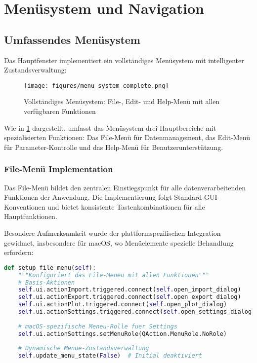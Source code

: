 \section{Menüsystem und Navigation}

\subsection{Umfassendes Menüsystem}

Das Hauptfenster implementiert ein vollständiges Menüsystem mit intelligenter Zustandsverwaltung:

\begin{figure}[H]
    \centering
\texttt{[image: figures/menu\_system\_complete.png]}
\caption{Vollständiges Menüsystem: File-, Edit- und Help-Menü mit allen verfügbaren Funktionen}
\label{fig:menu_system_complete}
\end{figure}

Wie in \ref{fig:menu_system_complete} dargestellt, umfasst das Menüsystem drei Hauptbereiche mit spezialisierten Funktionen: Das File-Menü für Datenmanagement, das Edit-Menü für Parameter-Kontrolle und das Help-Menü für Benutzerunterstützung.

\subsubsection{File-Menü Implementation}

Das File-Menü bildet den zentralen Einstiegspunkt für alle datenverarbeitenden Funktionen der Anwendung. Die Implementierung folgt Standard-GUI-Konventionen und bietet konsistente Tastenkombinationen für alle Hauptfunktionen.

Besondere Aufmerksamkeit wurde der plattformspezifischen Integration gewidmet, insbesondere für macOS, wo Menüelemente spezielle Behandlung erfordern:

\begin{lstlisting}[language=Python, caption=File-Menü Konfiguration]
def setup_file_menu(self):
    """Konfiguriert das File-Meneu mit allen Funktionen"""
    # Basis-Aktionen
    self.ui.actionImport.triggered.connect(self.open_import_dialog)
    self.ui.actionExport.triggered.connect(self.open_export_dialog)
    self.ui.actionPlot.triggered.connect(self.open_plot_dialog)
    self.ui.actionSettings.triggered.connect(self.open_settings_dialog)
    
    # macOS-spezifische Meneu-Rolle fuer Settings
    self.ui.actionSettings.setMenuRole(QAction.MenuRole.NoRole)
    
    # Dynamische Menue-Zustandsverwaltung
    self.update_menu_state(False)  # Initial deaktiviert
\end{lstlisting}

